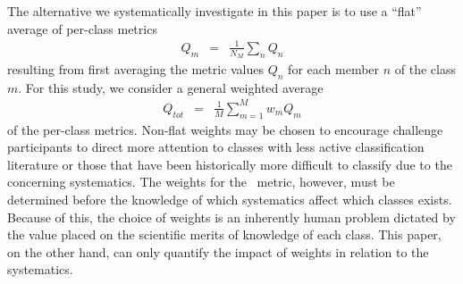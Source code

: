 The alternative we systematically investigate in this paper is to use a ``flat'' average of per-class metrics
\begin{eqnarray}
  \label{eq:perclassavg}
Q_{m} &=& \frac{1}{N_{M}}\sum_{n}Q_{n}
\end{eqnarray}
resulting from first averaging the metric values $Q_{n}$ for each member $n$ of the class $m$.
For this study, we consider a general weighted average
\begin{eqnarray}
  \label{eq:weightavg}
Q_{tot} &=& \frac{1}{M}\sum_{m=1}^{M}w_{m}Q_{m}
\end{eqnarray}
of the per-class metrics.
Non-flat weights may be chosen to encourage challenge participants to direct more attention to classes with less active classification literature or those that have been historically more difficult to classify due to the concerning systematics.
The weights for the \plasticc\ metric, however, must be determined before the knowledge of which systematics affect which classes exists.
Because of this, the choice of weights is an inherently human problem dictated by the value placed on the scientific merits of knowledge of each class.
This paper, on the other hand, can only quantify the impact of weights in relation to the systematics.
